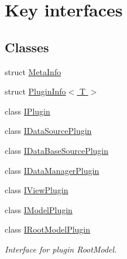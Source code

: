 \hypertarget{group__key__interfaces}{}\section{Key interfaces}
\label{group__key__interfaces}
\subsection*{Classes}
\begin{DoxyCompactItemize}
\item 
struct \hyperlink{struct_meta_info}{Meta\+Info}
\item 
struct \hyperlink{struct_plugin_info}{Plugin\+Info$<$ T $>$}
\item 
class \hyperlink{class_i_plugin}{I\+Plugin}
\item 
class \hyperlink{class_i_data_source_plugin}{I\+Data\+Source\+Plugin}
\item 
class \hyperlink{class_i_data_base_source_plugin}{I\+Data\+Base\+Source\+Plugin}
\item 
class \hyperlink{class_i_data_manager_plugin}{I\+Data\+Manager\+Plugin}
\item 
class \hyperlink{class_i_view_plugin}{I\+View\+Plugin}
\item 
class \hyperlink{class_i_model_plugin}{I\+Model\+Plugin}
\item 
class \hyperlink{class_i_root_model_plugin}{I\+Root\+Model\+Plugin}
\begin{DoxyCompactList}\small\item\em Interface for plugin Root\+Model. \end{DoxyCompactList}\end{DoxyCompactItemize}

